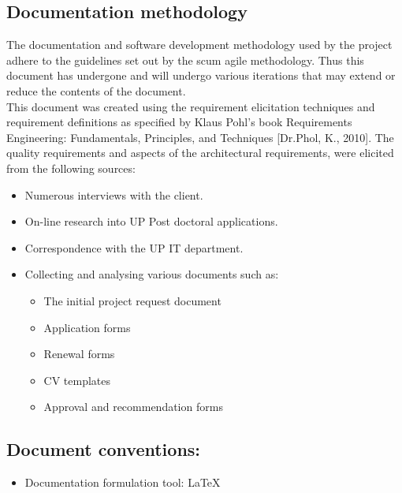 \documentclass[12pt]{article}
\begin{document}
\subsection{Documentation methodology}
\vspace{0.2in}
\begin{flushleft}
The documentation and software development methodology used by the project adhere to the guidelines set out by the scum agile methodology. Thus this document has undergone and will undergo various iterations that may extend or reduce the contents of the document.\\

This document was created using the requirement elicitation techniques and requirement definitions as specified by Klaus Pohl’s book Requirements Engineering: Fundamentals, Principles, and Techniques [Dr.Phol, K., 2010].
The quality requirements and aspects of the architectural requirements, were elicited from the following sources:
\begin{itemize}
	\item Numerous interviews with the client.
	\item On-line research into UP Post doctoral applications.
	\item Correspondence with the UP IT department.
	\item Collecting and analysing various documents such as:
		\begin{itemize}
			\item The initial project request document
			\item Application forms
			\item Renewal forms
			\item CV templates
			\item Approval and recommendation forms
		\end{itemize}
\end{itemize}
\end{flushleft}	

\vspace{0.5in}

\subsection{Document conventions:}
\vspace{0.1in}
\begin{itemize}
\item Documentation formulation tool: LaTeX

\end{itemize}
\end{document}
